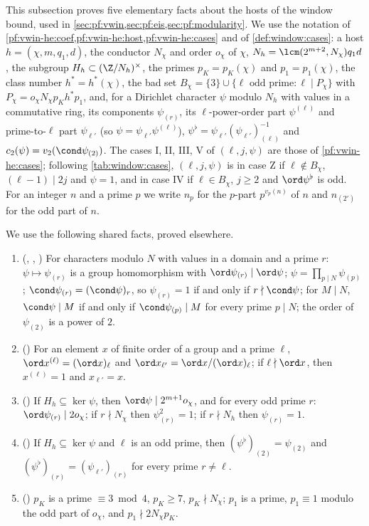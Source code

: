 This subsection proves five elementary facts about the hosts of the window bound, used in
\cref{sec:pf:vwin,sec:pf:eis,sec:pf:modularity}. We use the notation of \cref{pf:vwin-he:coef,pf:vwin-he:host,pf:vwin-he:cases}
and of \cref{def:window:cases}: a host $h=(\chi,m,q_1,d)$, the conductor $N_\chi$ and order $o_\chi$ of $\chi$,
$N_h=\lcm(2^{m+2},N_\chi)q_1d$, the subgroup $H_h\subset(\Z/N_h)^\times$, the primes $p_K=p_K(\chi)$ and $p_1=p_1(\chi)$, the class number
$h^*=h^*(\chi)$, the bad set $B_\chi=\{3\}\cup\{\ell\text{ odd prime}:\ell\mid P_\chi\}$ with $P_\chi=o_\chi N_\chi p_Kh^*p_1$, and, for a Dirichlet
character $\psi$ modulo $N_h$ with values in a commutative ring, its components $\psi_{(r)}$, its $\ell$-power-order part
$\psi^{(\ell)}$ and prime-to-$\ell$ part $\psi_{\ell'}$ (so $\psi=\psi_{\ell'}\psi^{(\ell)}$), $\psi^\flat=\psi_{\ell'}(\psi_{\ell'})_{(\ell)}^{-1}$ and
$c_2(\psi)=v_2(\cond\psi_{(2)})$. The cases I, II, III, V of $(\ell,j,\psi)$ are those of \cref{pf:vwin-he:cases}; following
\cref{tab:window:cases}, $(\ell,j,\psi)$ is in case Z if $\ell\notin B_\chi$, $(\ell-1)\mid2j$ and $\psi=1$, and in case IV if
$\ell\in B_\chi$, $j\ge2$ and $\ord\psi^\flat$ is odd. For an integer $n$ and a prime $p$ we write $n_p$ for the $p$-part
$p^{v_p(n)}$ of $n$ and $n_{(2')}$ for the odd part of $n$.

We use the following shared facts, proved elsewhere.
\begin{enumerate}[label=(F\arabic*)]
\item\label{pf:sh-misc:F-comp} (, ,
) For characters modulo $N$ with values in a domain and a prime $r$: $\psi\mapsto\psi_{(r)}$ is a group
homomorphism with $\ord\psi_{(r)}\mid\ord\psi$; $\psi=\prod_{p\mid N}\psi_{(p)}$; $\cond\psi_{(r)}=(\cond\psi)_r$, so $\psi_{(r)}=1$ if and only
if $r\nmid\cond\psi$; for $M\mid N$, $\cond\psi\mid M$ if and only if $\cond\psi_{(p)}\mid M$ for every prime $p\mid N$; the order of
$\psi_{(2)}$ is a power of $2$.
\item\label{pf:sh-misc:F-part} () For an element $x$ of finite order of a group and a prime $\ell$,
$\ord x^{(\ell)}=(\ord x)_\ell$ and $\ord x_{\ell'}=\ord x/(\ord x)_\ell$; if $\ell\nmid\ord x$, then $x^{(\ell)}=1$ and $x_{\ell'}=x$.
\item\label{pf:sh-misc:F-hostcomp} () If $H_h\subseteq\ker\psi$, then $\ord\psi\mid2^{m+1}o_\chi$, and for
every odd prime $r$: $\ord\psi_{(r)}\mid2o_\chi$; if $r\nmid N_\chi$ then $\psi_{(r)}^2=1$; if $r\nmid N_h$ then $\psi_{(r)}=1$.
\item\label{pf:sh-misc:F-th1} () If $H_h\subseteq\ker\psi$ and $\ell$ is an odd prime, then
$(\psi^\flat)_{(2)}=\psi_{(2)}$ and $(\psi^\flat)_{(r)}=(\psi_{\ell'})_{(r)}$ for every prime $r\ne\ell$.
\item\label{pf:sh-misc:F-pK} () $p_K$ is a prime $\equiv3\bmod4$, $p_K\ge7$,
$p_K\nmid N_\chi$; $p_1$ is a prime, $p_1\equiv1$ modulo the odd part of $o_\chi$, and $p_1\nmid2N_\chi p_K$.
\end{enumerate}

